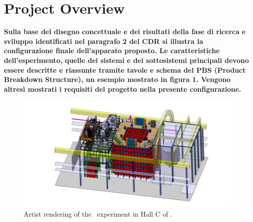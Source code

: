 \section{Project Overview}
\label{sec:ProjectOverview}

{\bf\color{red}Sulla base del disegno concettuale e dei risultati della fase di ricerca e sviluppo identificati nel paragrafo 2 del CDR si illustra la configurazione finale dell’apparato proposto. Le caratteristiche dell’esperimento, quelle dei sistemi e dei sottosistemi 
principali devono essere descritte e riassunte tramite tavole e schema del PBS (Product Breakdown Structure), un esempio mostrato in figura 1.
Vengono altresì mostrati i requisiti del progetto nella presente configurazione.}

\vspace{1cm}

\begin{figure}[t!]
\includegraphics[width=\textwidth]{./Figures/assembly_sequence_11_07/58.png}
\caption[Artist rendering of the \DSks\ experiment in Hall C of \LNGS]{Artist rendering of the \DSks\ experiment in Hall C of \LNGS.}
\label{fig:Overall-Design}
\end{figure}

